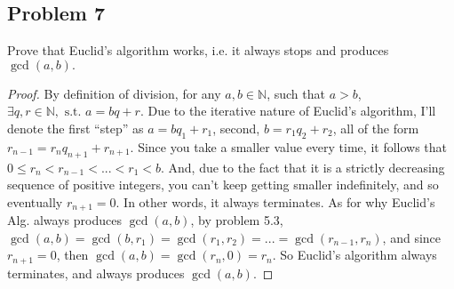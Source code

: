 \documentclass[12pt]{article}
\newcommand{\N}{\mathbb{N}}
\begin{document}
\subsection{Problem 7}
Prove that Euclid’s algorithm works, i.e. it always stops and produces $\gcd(a,b).$
\begin{proof}
By definition of division, for any $a,b\in\N$, such that $a>b$, $\exists q,r\in\N, \text{ s.t. } a=bq+r$. Due to the iterative nature of Euclid's algorithm, I'll denote the first ``step'' as $a=bq_1+r_1$, second, $b=r_1q_2+r_2$, all of the form $r_{n-1}=r_nq_{n+1}+r_{n+1}$. Since you take a smaller value every time, it follows that $0\leq r_{n}<r_{n-1}<...<r_1<b$. And, due to the fact that it is a strictly decreasing sequence of positive integers, you can't keep getting smaller indefinitely, and so eventually $r_{n+1}=0$. In other words, it always terminates. As for why Euclid's Alg. always produces $\gcd(a,b)$, by problem 5.3, $\gcd(a,b)=\gcd(b,r_1)=\gcd(r_1,r_2)=...=\gcd(r_{n-1},r_n)$, and since $r_{n+1}=0$, then $\gcd(a,b)=\gcd(r_n,0)=r_n$. So Euclid's algorithm always terminates, and always produces $\gcd(a,b)$.
\end{proof}
\end{document}
